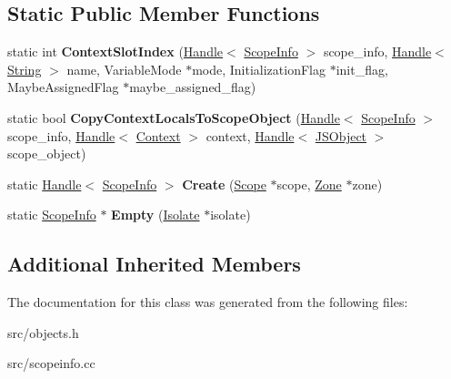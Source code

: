 \subsection*{Static Public Member Functions}
\begin{DoxyCompactItemize}
\item 
\hypertarget{classv8_1_1internal_1_1_scope_info_a0ca507b103cf2f4f4e1ac74610f721c9}{}static int {\bfseries Context\+Slot\+Index} (\hyperlink{classv8_1_1internal_1_1_handle}{Handle}$<$ \hyperlink{classv8_1_1internal_1_1_scope_info}{Scope\+Info} $>$ scope\+\_\+info, \hyperlink{classv8_1_1internal_1_1_handle}{Handle}$<$ \hyperlink{classv8_1_1internal_1_1_string}{String} $>$ name, Variable\+Mode $\ast$mode, Initialization\+Flag $\ast$init\+\_\+flag, Maybe\+Assigned\+Flag $\ast$maybe\+\_\+assigned\+\_\+flag)\label{classv8_1_1internal_1_1_scope_info_a0ca507b103cf2f4f4e1ac74610f721c9}

\item 
\hypertarget{classv8_1_1internal_1_1_scope_info_a9c668e116939fb2666583721746e1066}{}static bool {\bfseries Copy\+Context\+Locals\+To\+Scope\+Object} (\hyperlink{classv8_1_1internal_1_1_handle}{Handle}$<$ \hyperlink{classv8_1_1internal_1_1_scope_info}{Scope\+Info} $>$ scope\+\_\+info, \hyperlink{classv8_1_1internal_1_1_handle}{Handle}$<$ \hyperlink{classv8_1_1internal_1_1_context}{Context} $>$ context, \hyperlink{classv8_1_1internal_1_1_handle}{Handle}$<$ \hyperlink{classv8_1_1internal_1_1_j_s_object}{J\+S\+Object} $>$ scope\+\_\+object)\label{classv8_1_1internal_1_1_scope_info_a9c668e116939fb2666583721746e1066}

\item 
\hypertarget{classv8_1_1internal_1_1_scope_info_a8a1f23a4d02e7142e4aa543cd949daff}{}static \hyperlink{classv8_1_1internal_1_1_handle}{Handle}$<$ \hyperlink{classv8_1_1internal_1_1_scope_info}{Scope\+Info} $>$ {\bfseries Create} (\hyperlink{classv8_1_1internal_1_1_scope}{Scope} $\ast$scope, \hyperlink{classv8_1_1internal_1_1_zone}{Zone} $\ast$zone)\label{classv8_1_1internal_1_1_scope_info_a8a1f23a4d02e7142e4aa543cd949daff}

\item 
\hypertarget{classv8_1_1internal_1_1_scope_info_af725329f91ea78bed4ed726c8ec49784}{}static \hyperlink{classv8_1_1internal_1_1_scope_info}{Scope\+Info} $\ast$ {\bfseries Empty} (\hyperlink{classv8_1_1internal_1_1_isolate}{Isolate} $\ast$isolate)\label{classv8_1_1internal_1_1_scope_info_af725329f91ea78bed4ed726c8ec49784}

\end{DoxyCompactItemize}
\subsection*{Additional Inherited Members}


The documentation for this class was generated from the following files\+:\begin{DoxyCompactItemize}
\item 
src/objects.\+h\item 
src/scopeinfo.\+cc\end{DoxyCompactItemize}
